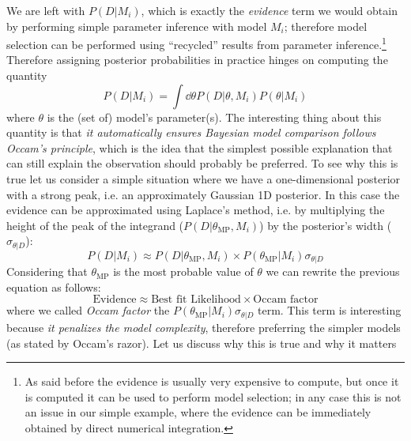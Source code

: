 We are left with $P(D|M_i)$, which is exactly the \emph{evidence} term we would obtain by performing simple parameter inference with model $M_i$; therefore model selection can be performed using ``recycled'' results from parameter inference.\footnote{As said before the evidence is usually very expensive to compute, but once it is computed it can be used to perform model selection; in any case this is not an issue in our simple example, where the evidence can be immediately obtained by direct numerical integration.}
Therefore assigning posterior probabilities in practice hinges on computing the quantity
\begin{equation*}
    P(D|M_i) = \int \dd{\theta} P(D|\theta, M_i) P(\theta|M_i)
\end{equation*}
where $\theta$ is the (set of) model's parameter(s).
The interesting thing about this quantity is that \emph{it automatically ensures Bayesian model comparison follows Occam's principle}, which is the idea that the simplest possible explanation that can still explain the observation should probably be preferred.
To see why this is true let us consider a simple situation where we have a one-dimensional posterior with a strong peak, i.e. an approximately Gaussian 1D posterior. In this case the evidence can be approximated using Laplace's method, i.e. by multiplying the height of the peak of the integrand ($P(D|\theta_{\text{MP}}, M_i)$) by the posterior's width ($\sigma_{\theta|D}$):
\begin{equation*}
    P(D|M_i) \approx P(D|\theta_{\text{MP}}, M_i) \times P(\theta_{\text{MP}}|M_i)\sigma_{\theta|D}
\end{equation*}
Considering that $\theta_{\text{MP}}$ is the most probable value of $\theta$ we can rewrite the previous equation as follows:
\begin{equation*}
    \text{Evidence} \approx \text{Best fit Likelihood} \times \text{Occam factor}
\end{equation*}
where we called \emph{Occam factor} the $P(\theta_{\text{MP}}|M_i)\sigma_{\theta|D}$ term. This term is interesting because \emph{it penalizes the model complexity}, therefore preferring the simpler models (as stated by Occam's razor).
Let us discuss why this is true and why it matters

